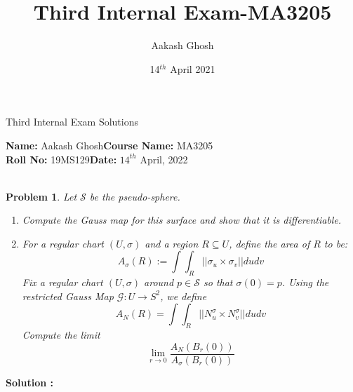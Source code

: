 \documentclass{article}
\title{Third Internal Exam-MA3205}
\author{Aakash Ghosh}
\date{14$^{th}$ April 2021}
\newtheorem{problem}{Problem}
\begin{document}
\begin{center}
    \Large{Third Internal Exam Solutions}    
\end{center}
\large{
\textbf{Name:} Aakash Ghosh\hfill \textbf{Course Name:} MA3205\\
\textbf{Roll No:} 19MS129\hfill\textbf{Date:} $14^{th}$ April, 2022}\\\\
\begin{tcolorbox}
\begin{problem}
Let $\mathscr{S}$ be the pseudo-sphere.
\begin{enumerate}
    \item Compute the Gauss map for this surface and show that it is differentiable.
    \item For a regular chart $(U,\sigma)$ and a region $R\subseteq U$, define the area of $R$ to be:
        $$A_{\sigma}(R):=\int\int_R||\sigma_u\times \sigma_v||dudv$$
    Fix a regular chart $(U,\sigma)$ around $p\in\mathscr{S}$ so that $\sigma(0)=p$. Using the restricted Gauss Map $\mathscr{G}:U\to S^2$, we define
    $$A_N(R)=\int\int_R||N^\sigma_u\times N^{\sigma}_v||dudv$$
    Compute the limit
        $$\lim_{r\to 0}\frac{A_N(B_r(0))}{A_\sigma(B_r(0))}$$
\end{enumerate}
\end{problem}
\end{tcolorbox}
\textbf{Solution :}
\end{document}
